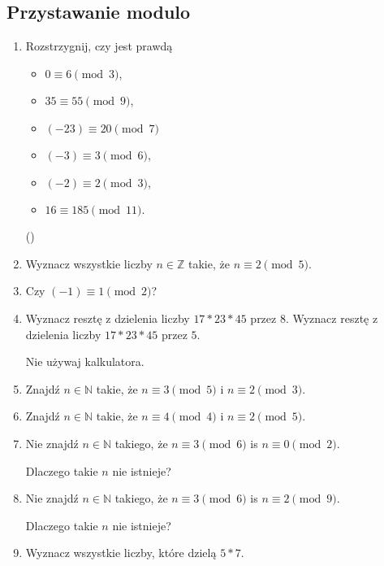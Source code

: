 \documentclass[12pt]{article}
\newcommand{\bbZ}{\mathbb{Z}}
\newcommand{\NN}{\mathbb{N}}
\begin{document}
\subsection{Przystawanie modulo}
\begin{enumerate}
    \item Rozstrzygnij, czy jest prawdą
    \begin{itemize}
        \item
    $0 \equiv 6 \pmod 3$,
    \item
 $35 \equiv 55 \pmod 9$,
\item  $(-23) \equiv 20 \pmod 7$
 \item $(-3) \equiv 3 \pmod 6$,
 \item $(-2) \equiv 2 \pmod 3$,
 \item $16 \equiv 185 \pmod 11.$
 \end{itemize}
    (\cite[sec. 6.1, p. 154]{Forman.2015})



\item
Wyznacz wszystkie liczby $n\in \bbZ$ takie, że
$n\equiv 2 \pmod 5$.
\item 
Czy $(-1)\equiv 1 \pmod 2$?

\item Wyznacz resztę z dzielenia liczby $17*23*45$ przez $8$.
 Wyznacz resztę z dzielenia liczby $17*23*45$ przez $5$.

Nie używaj kalkulatora.

\item Znajdź $n\in \NN$ takie, że $n\equiv 3 \pmod 5$ i 
$n\equiv 2 \pmod 3$.

\item Znajdź $n\in \NN$ takie, że $n\equiv 4 \pmod 4$ i 
$n\equiv 2 \pmod 5$.

\item Nie znajdź $n\in \NN$ takiego, że
$n\equiv 3 \pmod 6$ is $n\equiv 0 \pmod 2$.

Dlaczego takie $n$ nie istnieje?

\item Nie znajdź $n\in \NN$ takiego, że
$n\equiv 3 \pmod 6$ is $n\equiv 2 \pmod 9$.

Dlaczego takie $n$ nie istnieje?

\item Wyznacz wszystkie liczby, które dzielą $5*7$. 
 


\end{enumerate}
\end{document}
